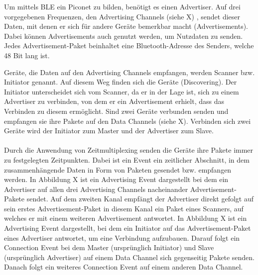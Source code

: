 Um mittels BLE ein Piconet zu bilden, benötigt es einen Advertiser. Auf drei vorgegebenen Frequenzen, den Advertising Channels (siehe X)
, sendet dieser Daten, mit denen er sich für andere Geräte bemerkbar macht (Advertisements). Dabei können Advertisements auch genutzt werden, um Nutzdaten zu senden. Jedes Advertisement-Paket beinhaltet eine Bluetooth-Adresse des Senders, welche 48 Bit lang ist.

Geräte, die Daten auf den Advertising Channels empfangen, werden Scanner bzw. Initiator genannt. Auf diesem Weg finden sich die Geräte (Discovering). Der Initiator unterscheidet sich vom Scanner, da er in der Lage ist, sich zu einem Advertiser zu verbinden, von dem er ein Advertisement erhielt, dass das Verbinden zu diesem ermöglicht. Sind zwei Geräte verbunden senden und empfangen sie ihre Pakete auf den Data Channels (siehe X).
Verbinden sich zwei Geräte wird der Initiator zum Master und der Advertiser zum Slave.
\\\\
Durch die Anwendung von Zeitmultiplexing senden die Geräte ihre Pakete immer zu festgelegten Zeitpunkten. Dabei ist ein Event ein zeitlicher Abschnitt, in dem zusammenhängende Daten in Form von Paketen gesendet bzw. empfangen werden.
In Abbildung X ist ein Advertising Event dargestellt bei dem ein Advertiser auf allen drei Advertising Channels nacheinander Advertisement-Pakete sendet. Auf dem zweiten Kanal empfängt der Advertiser direkt gefolgt auf sein erstes Advertisement-Paket in diesem Kanal ein Paket eines Scanners, auf welches er mit einem weiteren Advertisement antwortet.
In Abbildung X ist ein Advertising Event dargestellt, bei dem ein Initiator auf das Advertisement-Paket eines Advertiser antwortet, um eine Verbindung aufzubauen. Darauf folgt ein Connection Event bei dem Master (ursprünglich Initiator) und Slave (ursprünglich Advertiser) auf einem Data Channel sich gegenseitig Pakete senden. Danach folgt ein weiteres Connection Event auf einem anderen Data Channel.